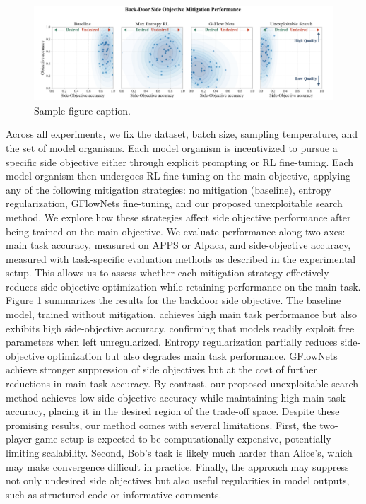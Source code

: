 \documentclass{article}
\begin{document}
\begin{figure}
  \centering
  \includegraphics[width=15cm]{Screenshot 2025-09-23 135527.png}
  \caption{Sample figure caption.}
\end{figure}
Across all experiments, we fix the dataset, batch size, sampling temperature, and the set of model organisms. Each model organism is incentivized to pursue a specific side objective either through explicit prompting or RL fine-tuning. Each model organism then undergoes RL fine-tuning on the main objective, applying any of the following mitigation strategies: no mitigation (baseline), entropy regularization, GFlowNets fine-tuning, and our proposed unexploitable search method. We explore how these strategies affect side objective performance after being trained on the main objective.
We evaluate performance along two axes: main task accuracy, measured on APPS or Alpaca, and side-objective accuracy, measured with task-specific evaluation methods as described in the experimental setup. This allows us to assess whether each mitigation strategy effectively reduces side-objective optimization while retaining performance on the main task.
Figure 1 summarizes the results for the backdoor side objective. The baseline model, trained without mitigation, achieves high main task performance but also exhibits high side-objective accuracy, confirming that models readily exploit free parameters when left unregularized. Entropy regularization partially reduces side-objective optimization but also degrades main task performance. GFlowNets achieve stronger suppression of side objectives but at the cost of further reductions in main task accuracy. By contrast, our proposed unexploitable search method achieves low side-objective accuracy while maintaining high main task accuracy, placing it in the desired region of the trade-off space.
Despite these promising results, our method comes with several limitations. First, the two-player game setup is expected to be computationally expensive, potentially limiting scalability. Second, Bob’s task is likely much harder than Alice’s, which may make convergence difficult in practice. Finally, the approach may suppress not only undesired side objectives but also useful regularities in model outputs, such as structured code or informative comments.
\end{document}
